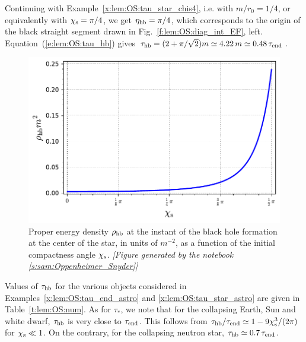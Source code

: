 \begin{example}
Continuing with Example~\ref{x:lem:OS:tau_star_chis4}, i.e. with
$m/r_0=1/4$, or equivalently with $\chi_{\rm s}=\pi/4$,
we get $\eta_{\rm hb} = \pi/4$, which corresponds to the origin of the
black straight segment drawn in Fig.~\ref{f:lem:OS:diag_int_EF}, left.
Equation~(\ref{e:lem:OS:tau_hb}) gives
$\tau_{\rm hb} = (2 + \pi/\sqrt{2}) m \simeq 4.22 \, m \simeq 0.48 \, \tau_{\rm end}$.
\end{example}

\begin{figure}
\centerline{
\includegraphics[height=0.35\textheight]{lem_OS_rho_hb.pdf}
}
\caption[]{\label{f:lem:OS:rho_hb} \footnotesize
Proper energy density $\rho_{\rm hb}$ at the instant of the black hole
formation at the center of the star, in units of $m^{-2}$,
as a function of the initial compactness angle $\chi_{\rm s}$.
\textsl{[Figure generated by the notebook \ref{s:sam:Oppenheimer_Snyder}]}
}
\end{figure}

\begin{example} \label{x:lem:OS:tau_hb}
Values of $\tau_{\rm hb}$ for the various objects considered in
Examples~\ref{x:lem:OS:tau_end_astro} and \ref{x:lem:OS:tau_star_astro}
are given in Table~\ref{t:lem:OS:num}. As for $\tau_*$, we note that
for the collapsing Earth, Sun and white dwarf,
$\tau_{\rm hb}$ is very close to $\tau_{\rm end}$. This follows from
$\tau_{\rm hb} / \tau_{\rm end}  \simeq 1 - 9 \chi_{\rm s}^3/(2\pi)$ for $\chi_{\rm s} \ll 1$.
On the contrary, for the collapsing neutron star,
$\tau_{\rm hb} \simeq 0.7 \, \tau_{\rm end}$.
\end{example}


